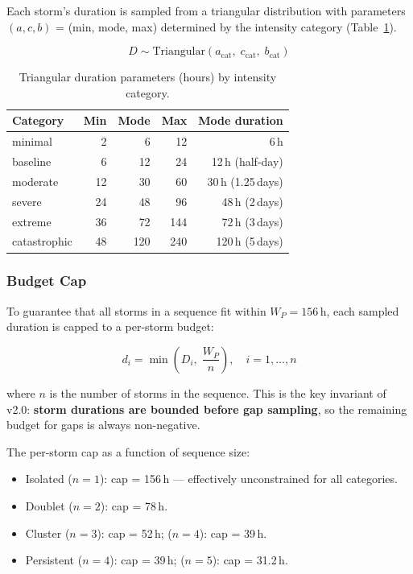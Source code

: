 \documentclass[11pt,a4paper]{article}
\begin{document}
Each storm's duration is sampled from a triangular distribution with parameters
$(a, c, b)$ = (min, mode, max) determined by the intensity category
(Table~\ref{tab:duration_params}).

\begin{equation}
  D \sim \mathrm{Triangular}(a_{\text{cat}},\; c_{\text{cat}},\; b_{\text{cat}})
  \label{eq:duration_sample}
\end{equation}

\begin{table}[H]
  \centering
  \caption{Triangular duration parameters (hours) by intensity category.}
  \label{tab:duration_params}
  \begin{tabular}{lrrrr}
    \toprule
    \textbf{Category} & \textbf{Min} & \textbf{Mode} & \textbf{Max}
      & \textbf{Mode duration} \\
    \midrule
    minimal      &  2 &   6 &  12 & 6\,h \\
    baseline     &  6 &  12 &  24 & 12\,h (half-day) \\
    moderate     & 12 &  30 &  60 & 30\,h (1.25\,days) \\
    severe       & 24 &  48 &  96 & 48\,h (2\,days) \\
    extreme      & 36 &  72 & 144 & 72\,h (3\,days) \\
    catastrophic & 48 & 120 & 240 & 120\,h (5\,days) \\
    \bottomrule
  \end{tabular}
\end{table}

\subsubsection{Budget Cap}
\label{sec:budget_cap}

To guarantee that all storms in a sequence fit within $W_P = 156\,\text{h}$, each
sampled duration is capped to a per-storm budget:

\begin{equation}
  d_i = \min\!\left(D_i,\; \frac{W_P}{n}\right), \quad i = 1, \ldots, n
  \label{eq:duration_cap}
\end{equation}

\noindent where $n$ is the number of storms in the sequence. This is the key
invariant of v2.0: \textbf{storm durations are bounded before gap sampling}, so
the remaining budget for gaps is always non-negative.

\noindent The per-storm cap as a function of sequence size:
\begin{itemize}[nosep]
  \item Isolated ($n=1$): cap = 156\,h --- effectively unconstrained for all categories.
  \item Doublet ($n=2$): cap = 78\,h.
  \item Cluster ($n=3$): cap = 52\,h; ($n=4$): cap = 39\,h.
  \item Persistent ($n=4$): cap = 39\,h; ($n=5$): cap = 31.2\,h.
\end{itemize}
\end{document}
